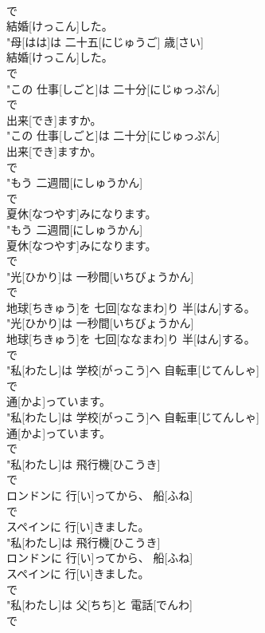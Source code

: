 \documentclass[8pt]{extreport}
\begin{document}
\begin{CJK}{UTF8}{min}
\\	で
\\	結婚[けっこん]した。
\\	"母[はは]は 二十五[にじゅうご] 歳[さい]
\\	結婚[けっこん]した。
\\	で
\\	"この 仕事[しごと]は 二十分[にじゅっぷん]
\\	で
\\	出来[でき]ますか。
\\	"この 仕事[しごと]は 二十分[にじゅっぷん]
\\	出来[でき]ますか。
\\	で
\\	"もう 二週間[にしゅうかん]
\\	で
\\	夏休[なつやす]みになります。
\\	"もう 二週間[にしゅうかん]
\\	夏休[なつやす]みになります。
\\	で
\\	"光[ひかり]は 一秒間[いちびょうかん]
\\	で
\\	地球[ちきゅう]を 七回[ななまわ]り 半[はん]する。
\\	"光[ひかり]は 一秒間[いちびょうかん]
\\	地球[ちきゅう]を 七回[ななまわ]り 半[はん]する。
\\	で
\\	"私[わたし]は 学校[がっこう]へ 自転車[じてんしゃ]
\\	で
\\	通[かよ]っています。
\\	"私[わたし]は 学校[がっこう]へ 自転車[じてんしゃ]
\\	通[かよ]っています。
\\	で
\\	"私[わたし]は 飛行機[ひこうき]
\\	で
\\	ロンドンに 行[い]ってから、 船[ふね]
\\	で
\\	スペインに 行[い]きました。
\\	"私[わたし]は 飛行機[ひこうき]
\\	ロンドンに 行[い]ってから、 船[ふね]
\\	スペインに 行[い]きました。
\\	で
\\	"私[わたし]は 父[ちち]と 電話[でんわ]
\\	で

\end{CJK}
\end{document}
